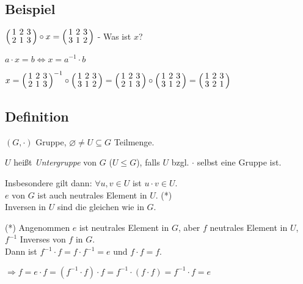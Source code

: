 
 \subsection{Beispiel}
 $
 \aMatrix{ccc}{
 	1 & 2 & 3 \\
 	2 & 1 & 3
 	}\circ
 	x =
 \aMatrix{ccc}{
 	1 & 2 & 3 \\
 	3 & 1 & 2
 	}
 	$
 - Was ist $x$?
 
 $ a \cdot x = b \Leftrightarrow x=a^{-1} \cdot b$
 
 $
 x =
  \aMatrix{ccc}{
  	1 & 2 & 3 \\
  	2 & 1 & 3
  }^{-1}\circ
 \aMatrix{ccc}{
 	1 & 2 & 3 \\
 	3 & 1 & 2
 } = 
  \aMatrix{ccc}{
  	1 & 2 & 3 \\
  	2 & 1 & 3
  }\circ
  \aMatrix{ccc}{
  	1 & 2 & 3 \\
  	3 & 1 & 2
  } =
  \aMatrix{ccc}{
  	1 & 2 & 3 \\
  	3 & 2 & 1
  }
  $

\subsection[Definition: Untergruppe]{Definition}

$(G,\cdot)$ Gruppe, $\varnothing \neq U \subseteq G$ Teilmenge.

$U$ heißt \emph{Untergruppe} von $G$ ($U\leqslant G$), falls $U$ bzgl. $\cdot$ selbst eine Gruppe ist.

Insbesondere gilt dann:
$\forall u,v \in U$ ist $u \cdot v \in  U$.\\
$e$ von $G$ ist auch neutrales Element in $U$. (*)\\
Inversen in $U$ sind die gleichen wie in $G$.

(*) Angenommen $e$ ist neutrales Element in $G$, aber $f$ neutrales Element in $U$, $f^{-1}$ Inverses von $f$ in $G$.\\
Dann ist $f^{-1} \cdot f= f \cdot f^{-1} = e$ und $f\cdot f = f$.

$\Rightarrow f = e \cdot f = (f^{-1} \cdot f) \cdot f = f^{-1} \cdot (f \cdot f) = f^{-1} \cdot f = e$

